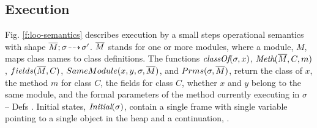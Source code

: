   

  
\subsection{\LangOO Execution}
\label{sect:execution}

{Fig. \ref{f:loo-semantics} describes \LangOO execution}  by a small steps operational semantics with shape  $\overline{M};\sigma\! \dashrightarrow\! {\sigma'}$.
  $\overline{M}$ stands for one or more modules, where a
  module,  $M$, maps class names to class definitions. 
  {%
  The functions $\textit{classOf}(\sigma, x)$, $\textit{Meth}(\overline{M}, C, m)$,
  { $fields(\overline{M},C)$,}
    ${SameModule(x,y,\sigma,\overline{M})}$, and $Prms(\sigma,\overline{M})$,
return the class of $x$, the method $m$ for class $C$, {the fields for class $C$,} whether $x$ and $y$ belong to the same module, and 
 the formal parameters of the method currently executing in $\sigma$ -- \cf Defs
. %
Initial states, $\textit{Initial}(\sigma)$, contain a single frame 
with single variable  pointing to a single object 
in the heap %
and a continuation, \cf {}.
}

